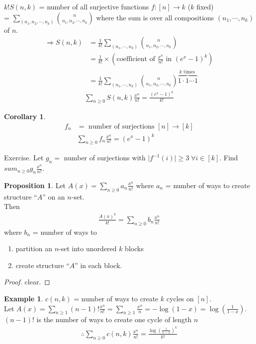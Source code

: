 \documentclass{article}
\theoremstyle{definition}
\newtheorem{ex}{Example}[]
\newtheorem{pp}{Proposition}
\newtheorem{cor}{Corollary}
\begin{document}
$k!S(n,k)$ = number of all surjective functions $f: [n] \rightarrow k$ ($k$ fixed)\\ 
= $\sum_{(n_1, n_2, \cdots , n_k)} {n \choose n_1, n_2, \cdots, n_k}$ where
the sum is over all compositions $(n_1, \cdots, n_k)$ of $n$.
\begin{align*}
    \Rightarrow S(n,k) &= \frac{1}{k!} \sum_{(n_1, \cdots, n_k)} {n \choose 
    n_1, n_2, \cdots, n_k} \\
    &= \frac{1}{k!} \times \left(\text{coefficient of } \frac{x^n}{n!} 
    \text{ in } (e^x - 1)^k\right) \\ 
    &= \frac{1}{k!} \sum_{(n_1, \cdots, n_k)} {n \choose n_1, n_2, \cdots, n_k}
    \overbrace{1 \cdot 1 \cdots 1}^{k \text{ times }}
\end{align*}
\begin{align*}
    \sum_{n\ge 0} S(n,k) \frac{x^n}{n!} = \frac{(e^x - 1)^k}{k!} 
\end{align*}
\begin{cor}
    \begin{align*}
        f_n &= \text{ number of surjections } [n] \rightarrow [k] \\ 
        &\sum_{n \ge 0}f_n \frac{x^n}{n!} = (e^x - 1)^k
    \end{align*}
\end{cor}
Exercise. Let $g_n =$ number of surjections with $\vert f^{-1}(i)\vert \ge 3 
\; \forall i \in [k]$. Find $sum_{n\ge 0} g_n \frac{x^n}{n!}$.
\begin{pp}
    Let $A(x) = \sum_{n\ge 0} a_n \frac{x^n}{n!}$ where $a_n$ = number of
    ways to create structure ``$A$'' on an $n$-set. \\ 
    Then 
    \begin{align*}
        \frac{A(x)^k}{k!} = \sum_{n\ge 0} b_n \frac{x^n}{n!}
    \end{align*}
    where $b_n$ = number of ways to 
    \begin{enumerate}
        \item partition an $n$-set into unordered $k$ blocks 
        \item create structure ``$A$'' in each block.
    \end{enumerate}
\end{pp}
\begin{proof}
    clear.
\end{proof}
\begin{ex}
    $c(n,k)$ = number of ways to create $k$ cycles on $[n]$. \\ 
    Let $A(x) = \sum_{n\ge 1} (n-1)! \frac{x^n}{n!} = \sum_{n\ge 1} 
    \frac{x^n}{n} = - \log (1-x) = \log(\frac{1}{1-x})$. \\
    $(n-1)!$ is the number of ways to create one cycle of length $n$
    \begin{align*}
        \therefore \sum_{n\ge 0} c(n,k)\frac{x^n}{n!} 
        = \frac{\log\left(\frac{1}{1-x}\right)^k}{k!}
    \end{align*}
\end{ex}
\end{document}

